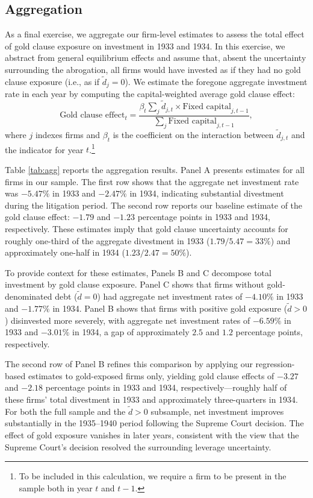 \subsection{Aggregation}
\label{sec:agg}
\noindent As a final exercise, we aggregate our firm-level estimates to assess the total effect of gold clause exposure on investment in 1933 and 1934. In this exercise, we abstract from general equilibrium effects and assume that, absent the uncertainty surrounding the abrogation, all firms would have invested as if they had no gold clause exposure (i.e., as if $\tilde{d}_j = 0$). We estimate the foregone aggregate investment rate in each year by computing the capital-weighted average gold clause effect:
\begin{equation}
\label{eq:aggregate}
\text{Gold clause effect}_t = \frac{\beta_t \sum_j \tilde{d}_{j,t} \times \text{Fixed capital}_{j,t-1}}{\sum_j \text{Fixed capital}_{j,t-1}},
\end{equation}
where $j$ indexes firms and $\beta_t$ is the coefficient on the interaction between $\tilde{d}_{j,t}$ and the indicator for year $t$.\footnote{To be included in this calculation, we require a firm to be present in the sample both in year $t$ and $t-1$.}

Table \ref{tab:agg} reports the aggregation results. Panel A presents estimates for all firms in our sample. The first row shows that the aggregate net investment rate was $-5.47\%$ in 1933 and $-2.47\%$ in 1934, indicating substantial divestment during the litigation period. The second row reports our baseline estimate of the gold clause effect: $-1.79$ and $-1.23$ percentage points in 1933 and 1934, respectively. These estimates imply that gold clause uncertainty accounts for roughly one-third of the aggregate divestment in 1933 ($1.79/5.47 = 33\%$) and approximately one-half in 1934 ($1.23/2.47 = 50\%$).

To provide context for these estimates, Panels B and C decompose total investment by gold clause exposure. Panel C shows that firms without gold-denominated debt ($\tilde{d}=0$) had aggregate net investment rates of $-4.10\%$ in 1933 and $-1.77\%$ in 1934. Panel B shows that firms with positive gold exposure ($\tilde{d}>0$) disinvested more severely, with aggregate net investment rates of $-6.59\%$ in 1933 and $-3.01\%$ in 1934, a gap of approximately $2.5$ and $1.2$ percentage points, respectively. 

The second row of Panel B refines this comparison by applying our regression-based estimates to gold-exposed firms only, yielding gold clause effects of $-3.27$ and $-2.18$ percentage points in 1933 and 1934, respectively---roughly half of these firms' total divestment in 1933 and approximately three-quarters in 1934. For both the full sample and the $\tilde{d}>0$ subsample, net investment improves substantially in the 1935--1940 period following the Supreme Court decision. The effect of gold exposure vanishes in later years, consistent with the view that the Supreme Court's decision resolved the surrounding leverage uncertainty.

